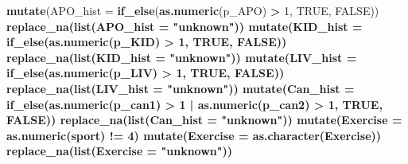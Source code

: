 \documentclass[]{article}
\newenvironment{Shaded}{\begin{snugshade}}{\end{snugshade}}
\newcommand{\CommentTok}[1]{\textcolor[rgb]{0.56,0.35,0.01}{\textit{#1}}}
\newcommand{\DataTypeTok}[1]{\textcolor[rgb]{0.13,0.29,0.53}{#1}}
\newcommand{\DecValTok}[1]{\textcolor[rgb]{0.00,0.00,0.81}{#1}}
\newcommand{\KeywordTok}[1]{\textcolor[rgb]{0.13,0.29,0.53}{\textbf{#1}}}
\newcommand{\NormalTok}[1]{#1}
\newcommand{\OperatorTok}[1]{\textcolor[rgb]{0.81,0.36,0.00}{\textbf{#1}}}
\newcommand{\OtherTok}[1]{\textcolor[rgb]{0.56,0.35,0.01}{#1}}
\newcommand{\StringTok}[1]{\textcolor[rgb]{0.31,0.60,0.02}{#1}}
\begin{document}
\begin{Shaded}
\begin{Highlighting}[]
{{{{{{{{{{{{{{{{{{\StringTok{  }\KeywordTok{mutate}\NormalTok{(}\DataTypeTok{APO_hist =} \KeywordTok{if_else}\NormalTok{(}\KeywordTok{as.numeric}\NormalTok{(p_APO) }\OperatorTok{>}\StringTok{ }\DecValTok{1}\NormalTok{, }\OtherTok{TRUE}\NormalTok{, }\OtherTok{FALSE}\NormalTok{)) }\OperatorTok{%
\StringTok{  }\KeywordTok{replace_na}\NormalTok{(}\KeywordTok{list}\NormalTok{(}\DataTypeTok{APO_hist =} \StringTok{"unknown"}\NormalTok{)) }\OperatorTok{%
\StringTok{  }\KeywordTok{mutate}\NormalTok{(}\DataTypeTok{KID_hist =} \KeywordTok{if_else}\NormalTok{(}\KeywordTok{as.numeric}\NormalTok{(p_KID) }\OperatorTok{>}\StringTok{ }\DecValTok{1}\NormalTok{, }\OtherTok{TRUE}\NormalTok{, }\OtherTok{FALSE}\NormalTok{)) }\OperatorTok{%
\StringTok{  }\KeywordTok{replace_na}\NormalTok{(}\KeywordTok{list}\NormalTok{(}\DataTypeTok{KID_hist =} \StringTok{"unknown"}\NormalTok{)) }\OperatorTok{%
\StringTok{  }\KeywordTok{mutate}\NormalTok{(}\DataTypeTok{LIV_hist =} \KeywordTok{if_else}\NormalTok{(}\KeywordTok{as.numeric}\NormalTok{(p_LIV) }\OperatorTok{>}\StringTok{ }\DecValTok{1}\NormalTok{, }\OtherTok{TRUE}\NormalTok{, }\OtherTok{FALSE}\NormalTok{)) }\OperatorTok{%
\StringTok{  }\KeywordTok{replace_na}\NormalTok{(}\KeywordTok{list}\NormalTok{(}\DataTypeTok{LIV_hist =} \StringTok{"unknown"}\NormalTok{)) }\OperatorTok{%
\StringTok{  }\KeywordTok{mutate}\NormalTok{(}\DataTypeTok{Can_hist =} \KeywordTok{if_else}\NormalTok{(}\KeywordTok{as.numeric}\NormalTok{(p_can1) }\OperatorTok{>}\StringTok{ }\DecValTok{1} \OperatorTok{|}\StringTok{ }
\StringTok{                              }\KeywordTok{as.numeric}\NormalTok{(p_can2) }\OperatorTok{>}\StringTok{ }\DecValTok{1}\NormalTok{, }\OtherTok{TRUE}\NormalTok{, }\OtherTok{FALSE}\NormalTok{)) }\OperatorTok{%
\StringTok{  }\KeywordTok{replace_na}\NormalTok{(}\KeywordTok{list}\NormalTok{(}\DataTypeTok{Can_hist =} \StringTok{"unknown"}\NormalTok{)) }\OperatorTok{%
\StringTok{  }\KeywordTok{mutate}\NormalTok{(}\DataTypeTok{Exercise =} \KeywordTok{as.numeric}\NormalTok{(sport) }\OperatorTok{!=}\StringTok{ }\DecValTok{4}\NormalTok{) }\OperatorTok{%
\StringTok{  }\KeywordTok{mutate}\NormalTok{(}\DataTypeTok{Exercise =} \KeywordTok{as.character}\NormalTok{(Exercise)) }\OperatorTok{%
\StringTok{  }\KeywordTok{replace_na}\NormalTok{(}\KeywordTok{list}\NormalTok{(}\DataTypeTok{Exercise =} \StringTok{"unknown"}\NormalTok{)) }\OperatorTok{%
}}}}}}}}}}}}}}}}}}}}}}}}}}}}}
\end{Highlighting}
\end{Shaded}
\end{document}
